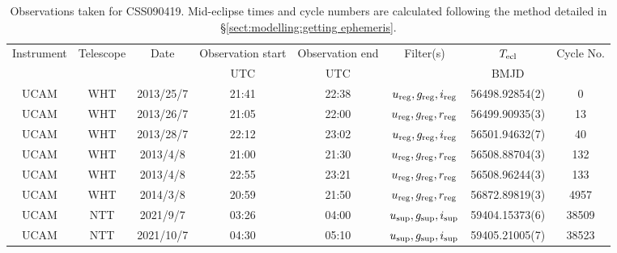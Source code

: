 \begin{table}
	\begin{center}
		\caption{Observations taken for CSS090419. Mid-eclipse times and cycle numbers are calculated following the method detailed in \S\ref{sect:modelling:getting ephemeris}.}
		\label{table:observing:observation logs CSS090419}
		\begin{tabular}{cccccccc}
			\hline
			Instrument & Telescope & Date & Observation start & Observation end & Filter(s) & $T_{\rm ecl}$ & Cycle No. \\
			 &  &  & UTC & UTC &  & BMJD &  \\
			\hline
			\hline
			UCAM & WHT & 2013/25/7 & 21:41 & 22:38 & $u_{\rm reg},g_{\rm reg},i_{\rm reg}$ & 56498.92854(2) &    0 \\
			UCAM & WHT & 2013/26/7 & 21:05 & 22:00 & $u_{\rm reg},g_{\rm reg},r_{\rm reg}$ & 56499.90935(3) &   13 \\
			UCAM & WHT & 2013/28/7 & 22:12 & 23:02 & $u_{\rm reg},g_{\rm reg},i_{\rm reg}$ & 56501.94632(7) &   40 \\
			UCAM & WHT & 2013/4/8  & 21:00 & 21:30 & $u_{\rm reg},g_{\rm reg},r_{\rm reg}$ & 56508.88704(3) &  132 \\
			UCAM & WHT & 2013/4/8  & 22:55 & 23:21 & $u_{\rm reg},g_{\rm reg},r_{\rm reg}$ & 56508.96244(3) &  133 \\
			UCAM & WHT & 2014/3/8  & 20:59 & 21:50 & $u_{\rm reg},g_{\rm reg},r_{\rm reg}$ & 56872.89819(3) & 4957 \\
			UCAM & NTT & 2021/9/7  & 03:26 & 04:00  & $u_{\rm sup},g_{\rm sup},i_{\rm sup}$ & 59404.15373(6) & 38509 \\
			UCAM & NTT & 2021/10/7 & 04:30 & 05:10  & $u_{\rm sup},g_{\rm sup},i_{\rm sup}$ & 59405.21005(7) & 38523 \\
		   \hline
		\end{tabular}
	\end{center}
\end{table}